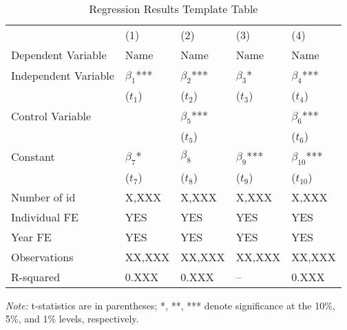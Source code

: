 \begin{table}[htbp]
\caption{Regression Results Template Table}
\label{Use the regression name as the label}
\centering
\begin{tabular}{p{2.4cm}p{2.4cm}p{2.4cm}p{2.4cm}p{2.4cm}} %
\toprule
& (1) & (2) & (3) & (4) \\
Dependent Variable   & Name & Name & Name & Name \\
\midrule
Independent Variable  & $\beta_1$*** & $\beta_2$*** & $\beta_3$* & $\beta_4$*** \\
            & ($t_1$) & ($t_2$) & ($t_3$) & ($t_4$) \\
Control Variable     &  & $\beta_5$*** &  & $\beta_6$*** \\  %
            &  & ($t_5$) &  & ($t_6$) \\
Constant    & $\beta_7$* & $\beta_8$ & $\beta_9$*** & $\beta_{10}$*** \\
            & ($t_7$) & ($t_8$) & ($t_9$) & ($t_{10}$) \\

Number of id       & X,XXX        & X,XXX        & X,XXX          & X,XXX \\
Individual FE      & YES          & YES          & YES            & YES \\
Year FE            & YES          & YES          & YES            & YES \\
Observations       & XX,XXX       & XX,XXX       & XX,XXX         & XX,XXX \\
R-squared          & 0.XXX        & 0.XXX        & --             & 0.XXX \\
\bottomrule
\end{tabular}
\begin{tablenotes}
\small
\item \textit{Note:} t-statistics are in parentheses; *, **, *** denote significance at the 10\%, 5\%, and 1\% levels, respectively.
\end{tablenotes}
\end{table}


